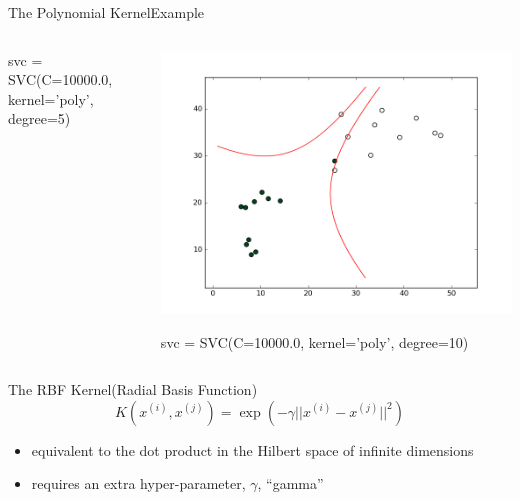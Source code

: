 \documentclass[xcolor=dvipsnames]{beamer}
\begin{document}
\begin{frame}{The Polynomial Kernel}{Example}
\begin{columns}
\begin{column}{0.33\textwidth}
\begin{center}
            \end{center}
            svc = SVC(C=10000.0, kernel='poly', degree=5)
        \end{column}
        \begin{column}{0.33\textwidth}
            \begin{center}
                \includegraphics[width=\textwidth]{figs/poly_d10.png}
            \end{center}
            svc = SVC(C=10000.0, kernel='poly', degree=10)
        \end{column}
    \end{columns}
\end{frame}

\begin{frame}{The RBF Kernel}{(Radial Basis Function)}
    \vspace{1em}
    $$K(x^{(i)}, x^{(j)}) = \exp{( -\gamma || x^{(i)} - x^{(j)} ||^2 )}$$
    \begin{itemize}
        \item<2-> equivalent to the dot product in the Hilbert space of infinite dimensions
        \item<3-> requires an extra hyper-parameter, $\gamma$, ``gamma''
    \end{itemize}
    \vspace{2em}
\end{frame}
\end{document}
